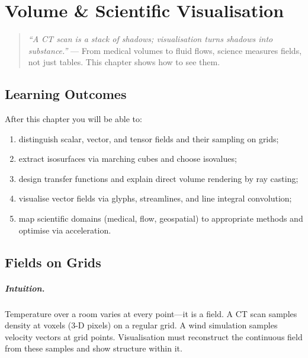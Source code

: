 \chapter{Volume \& Scientific Visualisation}
\label{ch:volume-scientific}
\sloppy

\begin{quote}
\emph{``A CT scan is a stack of shadows; visualisation turns shadows into substance.''} --- From medical volumes to fluid flows, science measures fields, not just tables. This chapter shows how to see them.
\end{quote}

\noindent{}
\vspace{0.4em}

\section*{Learning Outcomes}
After this chapter you will be able to:
\begin{enumerate}[label=(L\arabic*)]
    \item distinguish scalar, vector, and tensor fields and their sampling on grids;
    \item extract isosurfaces via marching cubes and choose isovalues;
    \item design transfer functions and explain direct volume rendering by ray casting;
    \item visualise vector fields via glyphs, streamlines, and line integral convolution;
    \item map scientific domains (medical, flow, geospatial) to appropriate methods and optimise via acceleration.
\end{enumerate}

\section{Fields on Grids}
\label{sec:fields}
\paragraph{Intuition.} Temperature over a room varies at every point---it is a field. A CT scan samples density at voxels (3-D pixels) on a regular grid. A wind simulation samples velocity vectors at grid points. Visualisation must reconstruct the continuous field from these samples and show structure within it.

